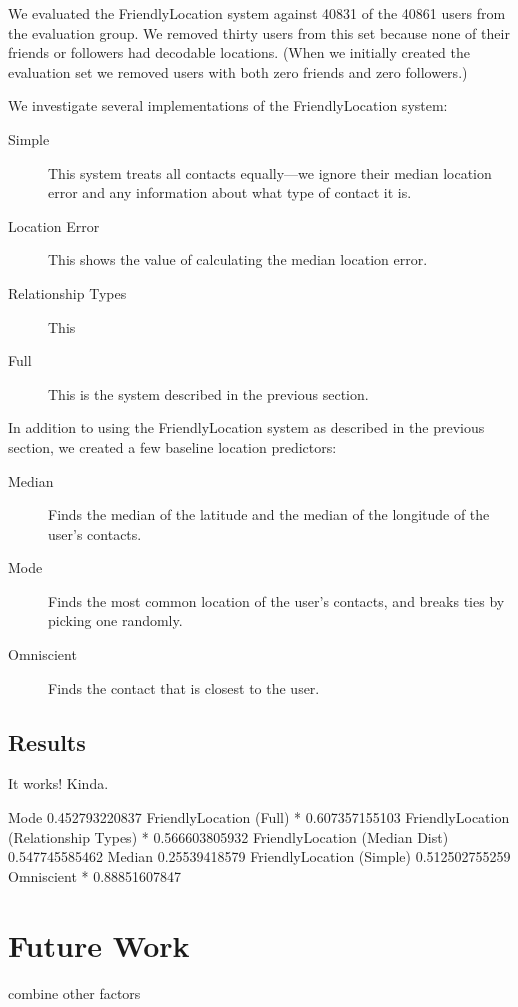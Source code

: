 \documentclass{sig-alternate}
\begin{document}
We evaluated the FriendlyLocation system against 40831 of the 40861 users from the evaluation group.
We removed thirty users from this set because none of their friends or
followers had decodable locations.
(When we initially created the evaluation
set we removed users with both zero friends and zero followers.)

We investigate several implementations of the FriendlyLocation system:
\begin{description}
\item[Simple] This system treats all contacts equally---we ignore their median location error and any information about what type of contact it is.
\item[Location Error] This shows the value of calculating the median location error.
\item[Relationship Types] This 
\item[Full] This is the system described in the previous section.
\end{description}

In addition to using the FriendlyLocation system as described in the previous section, we created a few baseline location predictors:
\begin{description}
\item[Median] Finds the median of the latitude and the median of the longitude of the user's contacts.
\item[Mode] Finds the most common location of the user's contacts, and breaks ties by picking one randomly.
\item[Omniscient] Finds the contact that is closest to the user.
\end{description}

\subsection{Results}
\begin{figure}
\centering
{}
\caption{
}
\label{fig:FinalResults}
\end{figure}

It works! Kinda.

Mode 0.452793220837
FriendlyLocation (Full) * 0.607357155103
FriendlyLocation (Relationship Types) * 0.566603805932
FriendlyLocation (Median Dist) 0.547745585462
Median 0.25539418579
FriendlyLocation (Simple) 0.512502755259
Omniscient * 0.88851607847


\section{Future Work}
combine other factors


 
\end{document}
